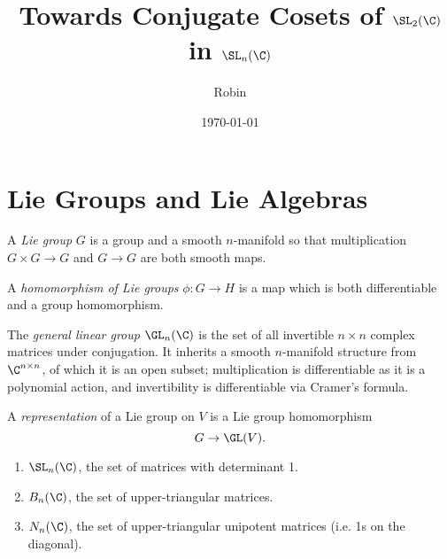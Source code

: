 \documentclass[12pt]{article}
\title{Towards Conjugate Cosets of $\SL_2(\C)$ in $\SL_n(\C)$}
\author{Robin}
\date{\today}
\begin{document}
\maketitle
\tableofcontents
\newpage
\thispagestyle{empty}

\section{Lie Groups and Lie Algebras}

\begin{definition}\label{def:Lie_Group}
    A \emph{Lie group} $G$ is a group and a smooth $n$-manifold so that multiplication $G \times G \rightarrow G$ and $G \rightarrow G$ are both smooth maps.
\end{definition}

\begin{definition}\label{def:Homomorphism_of_Lie_Groups}
    A \emph{homomorphism of Lie groups} $\phi: G \rightarrow H$ is a map which is both differentiable and a group homomorphism.
\end{definition}

\begin{example}\label{exam:General_Linear_Group}
    The \emph{general linear group $\GL_n(\C)$} is the set of all invertible $n \times n$ complex matrices under conjugation. It inherits a smooth $n$-manifold structure from $\C^{n \times n}$, of which it is an open subset; multiplication is differentiable as it is a polynomial action, and invertibility is differentiable via Cramer's formula.
\end{example}

\begin{definition}\label{def:Representation_of_a_Lie_Group}
    A \emph{representation} of a Lie group on $V$ is a Lie group homomorphism
    \begin{equation*}
        G \rightarrow \GL(V).
    \end{equation*}
\end{definition}

\begin{example}\label{exam:Other_Examples_of_Matrix_Groups}
    \begin{enumerate}
        \item $\SL_n(\C)$, the set of matrices with determinant 1. 
        \item $B_n(\C)$, the set of upper-triangular matrices.
        \item $N_n(\C)$, the set of upper-triangular unipotent matrices (i.e. 1s on the diagonal).
    \end{enumerate}
\end{example}
\end{document}
